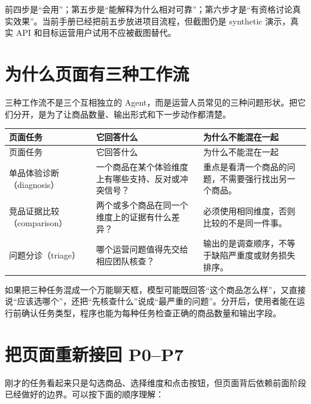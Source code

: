 前四步是“会用”；第五步是“能解释为什么相对可靠”；第六步才是“有资格讨论真实效果”。当前手册已经把前五步放进项目流程，但截图仍是 synthetic 演示，真实 API 和目标运营用户试用不应被截图替代。

\section{为什么页面有三种工作流}

三种工作流不是三个互相独立的 Agent，而是运营人员常见的三种问题形状。把它们分开，是为了让商品数量、输出形式和下一步动作都清楚。

\begin{longtable}{>{\raggedright\arraybackslash}p{}>{\raggedright\arraybackslash}p{}>{\raggedright\arraybackslash}p{}}
\toprule
页面任务 & 它回答什么 & 为什么不能混在一起 \\
\midrule
\endfirsthead
\toprule
页面任务 & 它回答什么 & 为什么不能混在一起 \\
\midrule
\endhead
单品体验诊断（diagnosis） & 一个商品在某个体验维度上有哪些支持、反对或冲突信号？ & 重点是看清一个商品的问题，不需要强行找出另一个商品。 \\
竞品证据比较（comparison） & 两个或多个商品在同一个维度上的证据有什么差异？ & 必须使用相同维度，否则比较的不是同一件事。 \\
问题分诊（triage） & 哪个运营问题值得先交给相应团队核查？ & 输出的是调查顺序，不等于缺陷严重度或财务损失排序。 \\
\bottomrule
\end{longtable}

如果把三种任务混成一个万能聊天框，模型可能既回答“这个商品怎么样”，又直接说“应该选哪个”，还把“先核查什么”说成“最严重的问题”。分开后，使用者能在运行前确认任务类型，程序也能为每种任务检查正确的商品数量和输出字段。

\section{把页面重新接回 P0--P7}

刚才的任务看起来只是勾选商品、选择维度和点击按钮，但页面背后依赖前面阶段已经做好的边界。可以按下面的顺序理解：

